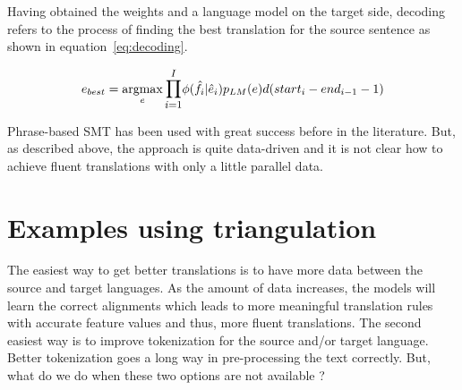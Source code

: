Having obtained the weights and a language model on the target side, decoding refers to the process of finding the best translation for the source sentence as shown in equation~\eqref{eq:decoding}. 


\begin{equation} \label{eq:decoding}
	e_{best} = \argmax_{e} \mathlarger{\prod\limits_{i=1}^I} \phi(\hat{f}_{i} | \hat{e}_{i})p_{LM}(e)d(start_{i} - end_{i-1}-1)
\end{equation}


Phrase-based SMT has been used with great success before in the literature. But, as described above, the approach is quite data-driven and it is not clear how to achieve fluent translations with only a little parallel data.  

\section{Examples using triangulation}

The easiest way to get better translations is to have more data between the source and target languages. As the amount of data increases, the models will learn the correct alignments which leads to more meaningful translation rules with accurate feature values and thus, more fluent translations. The second easiest way is to improve tokenization for the source and/or target language. Better tokenization goes a long way in pre-processing the text correctly. But, what do we do when these two options are not available ? 

\newcommand{\mawuexample}[1]{\emph{$y\grave{a}ng\acute{a}l\acute{a}\grave{a}$ w$\acute{\varepsilon}\acute{\varepsilon}$ $\grave{a}$ $\grave{a}$ l$\acute{a}$kw$\acute{e}$ k$\acute{o}\acute{o}$ b$\acute{\varepsilon}$ m$\grave{a}$ .}}

\newcommand{\anothermawu}[1]{\emph{\textipa{\!d}y$\grave{e}$n\textipa{\textltailn}$\acute{o}$ l$\grave{a}$ $\acute{i}$ kw$\acute{ɔ}$l$\grave{ɔ}$ $\acute{à}n$ d$\grave{a}$$\grave{a}$ l$\grave{u}$ m$\grave{a}$ }}

